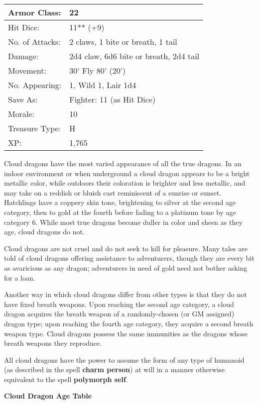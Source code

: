 \documentclass[a4paper,twoside,openany,10pt]{book}
\begin{document}
\begin{multicols}{2}
\begin{tabularx}{0.48\textwidth}{@{}lX@{}}
Armor Class: & 22 \\\hline
Hit Dice: & 11** (+9) \\\hline
No. of Attacks: & 2 claws, 1 bite or breath, 1 tail \\\hline
Damage: & 2d4 claw, 6d6 bite or breath, 2d4 tail \\\hline
Movement: & 30' Fly 80'
(20') \\\hline
No. Appearing: & 1, Wild 1, Lair 1d4 \\\hline
Save As: & Fighter: 11 (as Hit Dice) \\\hline
Morale: & 10 \\\hline
Treasure Type: & H \\\hline
XP: & 1,765 \\\hline
\end{tabularx}\medskip

Cloud dragons have the most varied appearance of all the true dragons. In an indoor environment or when underground a cloud dragon appears to be a bright metallic color, while outdoors their coloration is brighter and less metallic, and may take on a reddish or bluish cast reminiscent of a sunrise or sunset. Hatchlings have a coppery skin tone, brightening to silver at the second age category, then to gold at the fourth before fading to a platinum tone by age category 6. While most true dragons become duller in color and sheen as they age, cloud dragons do not.

Cloud dragons are not cruel and do not seek to kill for pleasure. Many tales are told of cloud dragons offering assistance to adventurers, though they are every bit as avaricious as any dragon; adventurers in need of gold need not bother asking for a loan.

Another way in which cloud dragons differ from other types is that they do not have fixed breath weapons. Upon reaching the second age category, a cloud dragon acquires the breath weapon of a randomly-chosen (or GM assigned) dragon type; upon reaching the fourth age category, they acquire a second breath weapon type. Cloud dragons possess the same immunities as the dragons whose breath weapons they reproduce.

All cloud dragons have the power to assume the form of any type of humanoid (as described in the spell \textbf{charm person}) at will in a manner otherwise equivalent to the spell \textbf{polymorph self}.

\textbf{Cloud Dragon Age Table}
	

\end{multicols}
\end{document}
